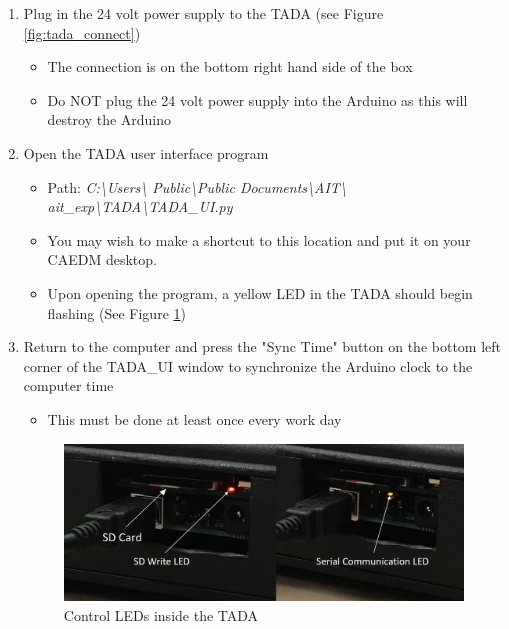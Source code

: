 \documentclass[letterpaper,11pt]{article}
\begin{document}
\begin{enumerate}
    \item Plug in the 24 volt power supply to the TADA (see Figure 
        \ref{fig:tada_connect})
		\begin{itemize}
        \item The connection is on the bottom right hand side of the box
        \item Do NOT plug the 24 volt power supply into the Arduino as this will
            destroy the Arduino
        \end{itemize}

    \item Open the TADA user interface program 
            \begin{itemize}
            \item Path: \textit{C:\textbackslash Users\textbackslash  
                Public\textbackslash Public Documents\textbackslash AIT\textbackslash 
                ait\_exp\textbackslash TADA\textbackslash TADA\_UI.py}
            \item You may wish to make a shortcut to this location and put it on 
                your CAEDM desktop.
            \item Upon opening the program, a yellow LED in the TADA should 
                begin flashing (See Figure \ref{fig:tada_leds}) %
            \end{itemize}

    \item Return to the computer and press the "Sync Time" button on the bottom 
        left corner of the TADA\_UI
        window to synchronize the Arduino clock to the computer time
        \begin{itemize}
        \item This must be done at least once every work day
        \end{itemize}

\begin{figure}[H]
    \centering
    \includegraphics[width=.75\textwidth]{led_red_yellow.jpg}
    \caption{Control LEDs inside the TADA}
    \label{fig:tada_leds}
\end{figure}


\end{enumerate}
\end{document}
